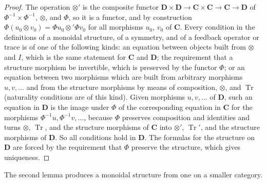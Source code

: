 \documentclass[11pt,a4paper]{article}
\theoremstyle{plain}
\theoremstyle{definition}
\theoremstyle{remark}
\newcommand{\Cat}[1]{\mathbf{#1}}
\DeclareMathOperator{\Tr}{Tr}
\begin{document}
\begin{proof}
    The operation $\otimes'$ is the composite functor $\Cat{D} \times \Cat{D} \to \Cat{C} \times \Cat{C} \to \Cat{C} \to \Cat{D}$ of $\Phi^{-1} \times \Phi^{-1}$, $\otimes$, and $\Phi$, so it is a functor, and by construction $\Phi(u_0 \otimes v_0) = \Phi u_0 \otimes' \Phi v_0$ for all morphisms $u_0$, $v_0$ of $\Cat{C}$.
    Every condition in the definitions of a monoidal structure, of a symmetry, and of a feedback operator or trace is of one of the following kinds: an equation between objects built from $\otimes$ and $I$, which is the same statement for $\Cat{C}$ and $\Cat{D}$; the requirement that a structure morphism be invertible, which is preserved by the functor $\Phi$; or an equation between two morphisms which are built from arbitrary morphisms $u, v, \ldots$ and from the structure morphisms by means of composition, $\otimes$, and $\Tr$ (naturality conditions are of this kind).
    Given morphisms $u, v, \ldots$ of $\Cat{D}$, such an equation in $\Cat{D}$ is the image under $\Phi$ of the corresponding equation in $\Cat{C}$ for the morphisms $\Phi^{-1}u, \Phi^{-1}v, \ldots$, because $\Phi$ preserves composition and identities and turns $\otimes$, $\Tr$, and the structure morphisms of $\Cat{C}$ into $\otimes'$, $\Tr'$, and the structure morphisms of $\Cat{D}$.
    So all conditions hold in $\Cat{D}$.
    The formulas for the structure on $\Cat{D}$ are forced by the requirement that $\Phi$ preserve the structure, which gives uniqueness.
\end{proof}

The second lemma produces a monoidal structure from one on a smaller category.
\end{document}
